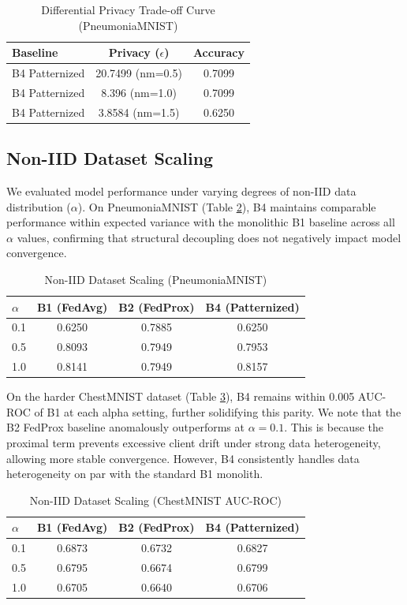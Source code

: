 \documentclass[10pt, conference]{IEEEtran}
\begin{document}
\begin{table}[h]
\centering
\caption{Differential Privacy Trade-off Curve (PneumoniaMNIST)}
\label{tab:dp}
\begin{tabular}{lcc}
\toprule
\textbf{Baseline} & \textbf{Privacy ($\epsilon$)} & \textbf{Accuracy} \\
\midrule
B4 Patternized & 20.7499 (nm=0.5) & 0.7099 \\
B4 Patternized & 8.396 (nm=1.0) & 0.7099 \\
B4 Patternized & 3.8584 (nm=1.5) & 0.6250 \\
\bottomrule
\end{tabular}
\end{table}

\subsection{Non-IID Dataset Scaling}
We evaluated model performance under varying degrees of non-IID data distribution ($\alpha$). On PneumoniaMNIST (Table \ref{tab:noniid_pneum}), B4 maintains comparable performance within expected variance with the monolithic B1 baseline across all $\alpha$ values, confirming that structural decoupling does not negatively impact model convergence. 

\begin{table}[h]
\centering
\caption{Non-IID Dataset Scaling (PneumoniaMNIST)}
\label{tab:noniid_pneum}
\begin{tabular}{lccc}
\toprule
$\alpha$ & \textbf{B1 (FedAvg)} & \textbf{B2 (FedProx)} & \textbf{B4 (Patternized)} \\
\midrule
0.1 & 0.6250 & 0.7885 & 0.6250 \\
0.5 & 0.8093 & 0.7949 & 0.7953 \\
1.0 & 0.8141 & 0.7949 & 0.8157 \\
\bottomrule
\end{tabular}
\end{table}

On the harder ChestMNIST dataset (Table \ref{tab:noniid_chest}), B4 remains within 0.005 AUC-ROC of B1 at each alpha setting, further solidifying this parity. We note that the B2 FedProx baseline anomalously outperforms at $\alpha=0.1$. This is because the proximal term prevents excessive client drift under strong data heterogeneity, allowing more stable convergence. However, B4 consistently handles data heterogeneity on par with the standard B1 monolith.

\begin{table}[h]
\centering
\caption{Non-IID Dataset Scaling (ChestMNIST AUC-ROC)}
\label{tab:noniid_chest}
\begin{tabular}{lccc}
\toprule
$\alpha$ & \textbf{B1 (FedAvg)} & \textbf{B2 (FedProx)} & \textbf{B4 (Patternized)} \\
\midrule
0.1 & 0.6873 & 0.6732 & 0.6827 \\
0.5 & 0.6795 & 0.6674 & 0.6799 \\
1.0 & 0.6705 & 0.6640 & 0.6706 \\
\bottomrule
\end{tabular}
\end{table}
\end{document}
